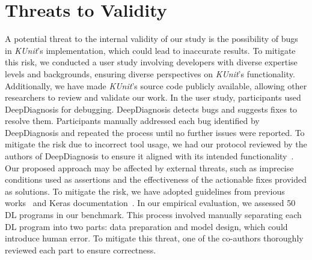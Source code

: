 \section{Threats to Validity}
\label{sec:THREATSTOVALIDITY}
A potential threat to the internal validity of our study is the possibility of bugs in {\em KUnit}'s implementation, which could lead to inaccurate results. To mitigate this risk, we conducted a user study involving developers with diverse expertise levels and backgrounds, ensuring diverse perspectives on {\em KUnit}'s functionality. Additionally, we have made {\em KUnit}'s source code publicly available, allowing other researchers to review and validate our work.
In the user study, participants used DeepDiagnosis for debugging. DeepDiagnosis detects bugs and suggests fixes to resolve them. Participants manually addressed each bug identified by DeepDiagnosis and repeated the process until no further issues were reported. To mitigate the risk due to incorrect tool usage, we had our protocol reviewed by the authors of DeepDiagnosis to ensure it aligned with its intended functionality~\cite{commwith}.
Our proposed approach may be affected by external threats, such as imprecise conditions used as assertions and the effectiveness of the actionable fixes provided as solutions. To mitigate the risk, we have adopted guidelines from previous works~\cite{islam20repairing,wardat22DeepDiagnosis,Zhang21Autotrainer,ahmed23dlcontract,Khairunnesa2023,cao2022deepfd,ghanbari2023deepmufl} and Keras documentation~\cite{Keras,kerasexamples}. 
In our empirical evaluation, we assessed 50 DL programs in our benchmark. This process involved manually separating each DL program into two parts: data preparation and model design, which could introduce human error. To mitigate this threat, one of the co-authors thoroughly reviewed each part to 
ensure correctness.




